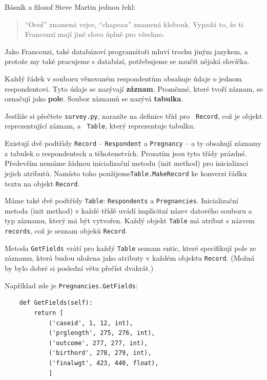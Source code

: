 \documentclass[12pt]{book}
\begin{document}
Básník a filozof Steve Martin jednou řekl:
%
\begin{quote}
``Oeuf'' znamená vejce, ``chapeau'' znamená klobouk.  Vypadá to, že ti Francouzi mají jiné slovo úplně pro všechno.
\end{quote}
%
Jako Francouzi, také databázoví programátoři mluví trochu jiným jazykem, a protože my také pracujeme s databází, potřebujeme se naučit nějaká slovíčka.

Každý řádek v souboru věnovaném respondentům obsahuje údaje o jednom respondentovi. Tyto údaje se nazývají {\bf záznam}.  Proměnné, které tvoří záznam, se označují jako {\bf pole}.  Soubor záznamů se nazývá {\bf tabulka}.

Jestliže si přečtete {\tt survey.py}, narazíte na definice tříd pro {\tt
  Record}, což je objekt reprezentující záznam, a {\tt
  Table}, který reprezentuje tabulku.

Existují dvě podtřídy {\tt Record} -- {\tt Respondent} a {\tt Pregnancy} --  a ty obsahují záznamy z tabulek o respondentech a těhotenstvích. Prozatím jsou tyto třídy prázdné. Především nemáme žádnou inicializační metodu (init method) pro inicializaci jejich atributů. Namísto toho použijeme{\tt Table.MakeRecord} ke konverzi řádku textu na objekt {\tt Record}.

Máme také dvě podtřídy {\tt Table}: {\tt Respondents}
a {\tt Pregnancies}.  Inicializační metoda (init method) v každé třídě uvádí implicitní název datového souboru a typ záznamu, který má být vytvořen. Každý objekt {\tt Table} má atribut s názvem {\tt records}, což je seznam objeků {\tt Record}.

Metoda {\tt GetFields} vrátí pro každý {\tt Table} seznam entic, které specifikují pole ze záznamu, která budou uložena jako atributy v každém objektu {\tt Record}. (Možná by bylo dobré si poslední větu přečíst dvakrát.)

Například zde je {\tt Pregnancies.GetFields}:
%
\begin{verbatim}
    def GetFields(self):
        return [
            ('caseid', 1, 12, int),
            ('prglength', 275, 276, int),
            ('outcome', 277, 277, int),
            ('birthord', 278, 279, int),
            ('finalwgt', 423, 440, float),
            ]
\end{verbatim}
\end{document}
